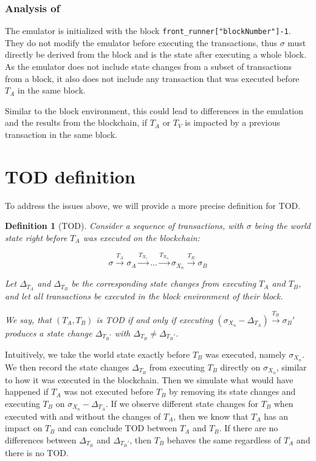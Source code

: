 \documentclass[draft,final]{vutinfth} %
\newtheorem{definition}{Definition}
\begin{document}
\subsubsection{Analysis of \cite{torres_frontrunner_2021}}

The emulator is initialized with the block \verb|front_runner["blockNumber"]-1|. They do not modify the emulator before executing the transactions, thus $\sigma$ must directly be derived from the block and is the state after executing a whole block. As the emulator does not include state changes from a subset of transactions from a block, it also does not include any transaction that was executed before $T_A$ in the same block.

Similar to the block environment, this could lead to differences in the emulation and the results from the blockchain, if $T_A$ or $T_V$ is impacted by a previous transaction in the same block.

\section{TOD definition}

To address the issues above, we will provide a more precise definition for TOD.

\begin{definition}[TOD]
    Consider a sequence of transactions, with $\sigma$ being the world state right before $T_A$ was executed on the blockchain:

    $$\sigma \xrightarrow{T_A} \sigma_A \xrightarrow{T_{X_1}} \dots \xrightarrow{T_{X_n}} \sigma_{X_n} \xrightarrow{T_B} \sigma_B$$

    Let $\Delta_{T_A}$ and $\Delta_{T_B}$ be the corresponding state changes from executing $T_A$ and $T_B$, and let all transactions be executed in the block environment of their block.

    We say, that $(T_A, T_B)$ is TOD if and only if executing $(\sigma_{X_n} - \Delta_{T_A}) \xrightarrow{T_B} \sigma_B\prime$ produces a state change $\Delta_{T_B\prime}$ with $\Delta_{T_B} \neq \Delta_{T_B\prime}$.
\end{definition}

Intuitively, we take the world state exactly before $T_B$ was executed, namely $\sigma_{X_n}$. We then record the state changes $\Delta_{T_B}$ from executing $T_B$ directly on $\sigma_{X_n}$, similar to how it was executed in the blockchain. Then we simulate what would have happened if $T_A$ was not executed before $T_B$ by removing its state changes and executing $T_B$ on $\sigma_{X_n} - \Delta_{T_A}$. If we observe different state changes for $T_B$ when executed with and without the changes of $T_A$, then we know that $T_A$ has an impact on $T_B$ and can conclude TOD between $T_A$ and $T_B$. If there are no differences between $\Delta_{T_B}$ and $\Delta_{T_B\prime}$, then $T_B$ behaves the same regardless of $T_A$ and there is no TOD.
\end{document}
